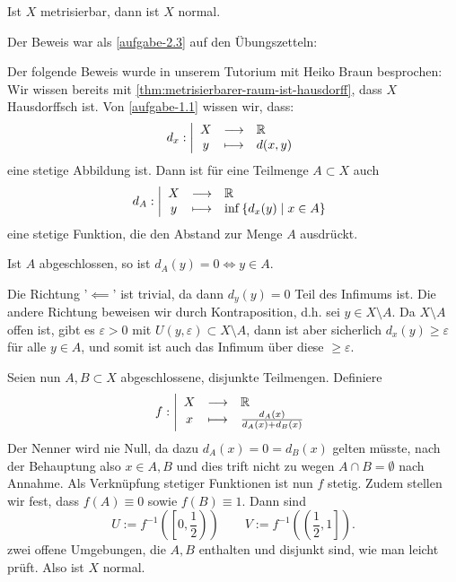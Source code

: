 \begin{theorem}\label{thm:metrischer-raum-ist-normal}
    Ist $X$ metrisierbar, dann ist  $X$ normal.
\end{theorem}

Der Beweis war als \autoref{aufgabe-2.3} auf den Übungszetteln:
\begin{proof*}
    Der folgende Beweis wurde in unserem Tutorium mit {\sc Heiko Braun} besprochen: \\
    Wir wissen bereits mit \autoref{thm:metrisierbarer-raum-ist-hausdorff}, dass $X$ Hausdorffsch ist. Von \ref{aufgabe-1.1} wissen wir, dass:
        \begin{equation*}
        d_x: \left| \begin{array}{c c l} 
        X & \longrightarrow & \mathbb{R} \\
        y & \longmapsto &  d(x,y)
        \end{array} \right.
    \end{equation*}
    eine stetige Abbildung ist. Dann ist für eine Teilmenge $A\subset X$ auch
        \begin{equation*}
        d_A: \left| \begin{array}{c c l} 
        X & \longrightarrow & \mathbb{R} \\
        y & \longmapsto &  \inf \left \{d_x(y) \mid x\in A\right\} 
        \end{array} \right.
    \end{equation*}
    eine stetige Funktion, die den Abstand zur Menge $A$ ausdrückt.
    \begin{claim}
        Ist $A$ abgeschlossen, so ist $d_A(y) = 0 \iff y\in A$.
    \end{claim}
    \begin{subproof}
        Die Richtung '$ \impliedby$' ist trivial, da dann $d_y(y) = 0$ Teil des Infimums ist. Die andere Richtung beweisen wir durch Kontraposition, d.h. sei $y \in X\setminus A$. Da $X \setminus A$ offen ist, gibt es $ε>0$ mit $U(y,ε) \subset X\setminus A$, dann ist aber sicherlich $d_x(y) \geq ε$ für alle $y \in A$, und somit ist auch das Infimum über diese $ \geq ε$.
    \end{subproof}
Seien nun $A,B \subset X$ abgeschlossene, disjunkte Teilmengen. Definiere
\begin{equation*}
        f: \left| \begin{array}{c c l} 
        X & \longrightarrow & \mathbb{R} \\
        x & \longmapsto &  \frac{d_A(x)}{d_A(x) + d_B(x)}
        \end{array} \right.
    \end{equation*}
    Der Nenner wird nie Null, da dazu $d_A(x) = 0 = d_B(x)$ gelten müsste, nach der Behauptung also  $x\in A,B$ und dies trift nicht zu wegen $A\cap B = \emptyset$ nach Annahme. Als Verknüpfung stetiger Funktionen ist nun $f$ stetig. Zudem stellen wir fest, dass  $f(A) \equiv 0$ sowie $f(B) \equiv 1$. Dann sind
     \[
         U := f^{-1}\left( \left[ 0,\frac{1}{2} \right)  \right)  \qquad V := f^{-1}\left( \left( \frac{1}{2},1 \right]  \right) 
    .\] 
    zwei offene Umgebungen, die $A,B$ enthalten und disjunkt sind, wie man leicht prüft. Also ist  $X$ normal.
\end{proof*}

